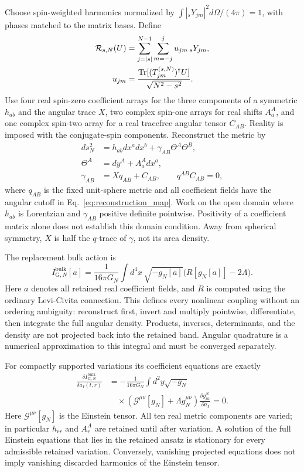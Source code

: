 Choose spin-weighted harmonics normalized by $\int |{}_sY_{jm}|^2d\Omega/(4\pi)=1$, with phases matched to the matrix bases. Define
\begin{align}\label{eq:reconstruction_map}
\mathcal R_{s,N}(U)&=\sum_{j=|s|}^{N-1}\sum_{m=-j}^j u_{jm}\,{}_sY_{jm},\nonumber\\
u_{jm}&=\frac{\mathrm{Tr}[(T^{(s,N)}_{jm})^\dagger U]}{\sqrt{N^2-s^2}}.
\end{align}
Use four real spin-zero coefficient arrays for the three components of a symmetric $h_{ab}$ and the angular trace $X$, two complex spin-one arrays for real shifts $A_a^A$, and one complex spin-two array for a real tracefree angular tensor $C_{AB}$. Reality is imposed with the conjugate-spin components. Reconstruct the metric by
\begin{align}\label{eq:galerkin_metric}
ds_N^2&=h_{ab}dx^a dx^b+\gamma_{AB}\Theta^A\Theta^B,\nonumber\\
\Theta^A&=dy^A+A_a^A dx^a,\nonumber\\
\gamma_{AB}&=Xq_{AB}+C_{AB},\qquad q^{AB}C_{AB}=0,
\end{align}
where $q_{AB}$ is the fixed unit-sphere metric and all coefficient fields have the angular cutoff in Eq.~\eqref{eq:reconstruction_map}. Work on the open domain where $h_{ab}$ is Lorentzian and $\gamma_{AB}$ positive definite pointwise. Positivity of a coefficient matrix alone does not establish this domain condition. Away from spherical symmetry, $X$ is half the $q$-trace of $\gamma$, not its area density.

The replacement bulk action is
\begin{equation}\label{eq:explicit_IFSG}
I_{\mathrm{G},N}^{\mathrm{bulk}}[a]
=\frac1{16\pi G_N}\int d^4x\,\sqrt{-g_N[a]}
\big(R[g_N[a]]-2\Lambda\big).
\end{equation}
Here $a$ denotes all retained real coefficient fields, and $R$ is computed using the ordinary Levi-Civita connection. This defines every nonlinear coupling without an ordering ambiguity: reconstruct first, invert and multiply pointwise, differentiate, then integrate the full angular density. Products, inverses, determinants, and the density are not projected back into the retained band. Angular quadrature is a numerical approximation to this integral and must be converged separately.

For compactly supported variations its coefficient equations are exactly
\begin{align}\label{eq:galerkin_eom}
\frac{\delta I_{\mathrm{G},N}^{\mathrm{bulk}}}{\delta a_I(t,r)}
&=-\frac1{16\pi G_N}\int d^2y\sqrt{-g_N}\nonumber\\
&\quad\times(\mathcal G^{\mu\nu}[g_N]+\Lambda g_N^{\mu\nu})
\frac{\partial g^N_{\mu\nu}}{\partial a_I}=0.
\end{align}
Here $\mathcal G^{\mu\nu}[g_N]$ is the Einstein tensor. All ten real metric components are varied; in particular $h_{rr}$ and $A_r^A$ are retained until after variation. A solution of the full Einstein equations that lies in the retained ansatz is stationary for every admissible retained variation. Conversely, vanishing projected equations does not imply vanishing discarded harmonics of the Einstein tensor.

